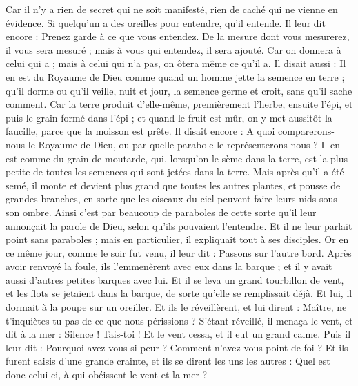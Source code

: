 \begin{multicols}{2}
Car il n'y a rien de secret qui ne soit manifesté, rien de caché qui ne vienne en évidence.
Si quelqu'un a des oreilles pour entendre, qu'il entende.
Il leur dit encore : Prenez garde à ce que vous entendez. De la mesure dont vous mesurerez, il vous sera mesuré ; mais à vous qui entendez, il sera ajouté.
Car on donnera à celui qui a ; mais à celui qui n’a pas, on ôtera même ce qu’il a.
Il disait aussi : Il en est du Royaume de Dieu comme quand un homme jette la semence en terre ;
qu’il dorme ou qu’il veille, nuit et jour, la semence germe et croit, sans qu'il sache comment.
Car la terre produit d'elle-même, premièrement l'herbe, ensuite l'épi, et puis le grain formé dans l'épi ;
et quand le fruit est mûr, on y met aussitôt la faucille, parce que la moisson est prête.
Il disait encore : A quoi comparerons-nous le Royaume de Dieu, ou par quelle parabole le représenterons-nous ?
Il en est comme du grain de moutarde, qui, lorsqu'on le sème dans la terre, est la plus petite de toutes les semences qui sont jetées dans la terre.
Mais après qu'il a été semé, il monte et devient plus grand que toutes les autres plantes, et pousse de grandes branches, en sorte que les oiseaux du ciel peuvent faire leurs nids sous son ombre.
Ainsi c’est par beaucoup de paraboles de cette sorte qu’il leur annonçait la parole de Dieu, selon qu'ils pouvaient l'entendre.
Et il ne leur parlait point sans paraboles ; mais en particulier, il expliquait tout à ses disciples.
Or en ce même jour, comme le soir fut venu, il leur dit : Passons sur l’autre bord.
Après avoir renvoyé la foule, ils l'emmenèrent avec eux dans la barque ; et il y avait aussi d'autres petites barques avec lui.
Et il se leva un grand tourbillon de vent, et les flots se jetaient dans la barque, de sorte qu'elle se remplissait déjà.
Et lui, il dormait à la poupe sur un oreiller. Et ils le réveillèrent, et lui dirent : Maître, ne t’inquiètes-tu pas de ce que nous périssions ?
S’étant réveillé, il menaça le vent, et dit à la mer : Silence ! Tais-toi ! Et le vent cessa, et il eut un grand calme.
Puis il leur dit : Pourquoi avez-vous si peur ? Comment n'avez-vous point de foi ?
Et ils furent saisis d'une grande crainte, et ils se dirent les uns les autres : Quel est donc celui-ci, à qui obéissent le vent et la mer ?

\end{multicols}
